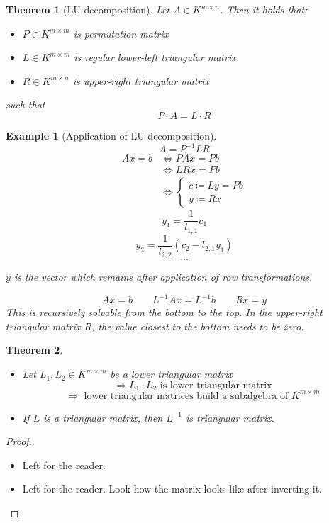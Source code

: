 \documentclass[a4paper,landscape,twocolumn]{article}
\newtheorem{theorem}{Theorem}
\newtheorem{ex}{Example}
\begin{document}
\begin{theorem}[LU-decomposition]
  \label{satz-6.46}
  Let $A \in K^{m\times n}$.
  Then it holds that:
  \begin{itemize}
    \item $P \in K^{m\times m}$ is permutation matrix
    \item $L \in K^{m\times m}$ is regular lower-left triangular matrix
    \item $R \in K^{m\times n}$ is upper-right triangular matrix
  \end{itemize}
  such that
  \[ P \cdot A = L \cdot R \]
\end{theorem}
\begin{ex}[Application of LU decomposition]
  \[ A = P^{-1} L R \]
  \begin{align*}
    Ax = b &\Leftrightarrow PAx = Pb \\
      &\Leftrightarrow LRx = Pb \\
      &\Leftrightarrow \begin{cases}
          c \coloneqq Ly = Pb \\
          y \coloneqq Rx
        \end{cases}
  \end{align*}
  \[ y_1 = \frac1{l_{1,1}} c_1 \]
  \[ y_2 = \frac1{l_{2,2}} (c_2 - l_{2,1} y_1) \]
  \[ \ldots \]

  $y$ is the vector which remains after application of row transformations.

  \[ Ax = b \qquad L^{-1} A x = L^{-1} b \qquad Rx = y \]
  This is recursively solvable from the bottom to the top.
  In the upper-right triangular matrix $R$, the value closest to the bottom
  needs to be zero.
\end{ex}

\begin{theorem}
  \label{lemma-6.47}
  \begin{itemize}
    \item Let $L_1, L_2 \in K^{m\times m}$ be a lower triangular matrix
      \[ \Rightarrow L_1 \cdot L_2 \text{ is lower triangular matrix} \]
      \[ \Rightarrow \text{ lower triangular matrices build a subalgebra of } K^{m\times m} \]
    \item If $L$ is a triangular matrix, then $L^{-1}$ is triangular matrix.
  \end{itemize}
\end{theorem}
\begin{proof}
  \begin{itemize}
    \item Left for the reader.
    \item Left for the reader. Look how the matrix looks like after inverting it.
  \end{itemize}
\end{proof}
\end{document}
